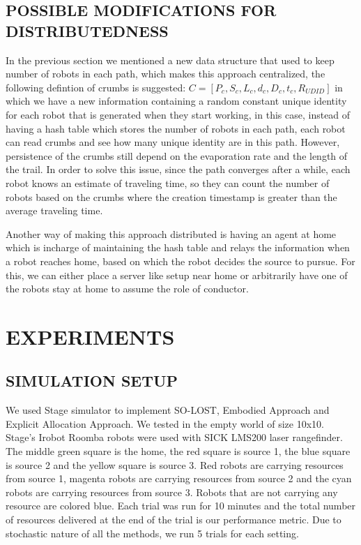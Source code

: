\documentclass[letterpaper, 10 pt, conference]{ieeeconf}  %
\begin{document}
\subsection{POSSIBLE MODIFICATIONS FOR DISTRIBUTEDNESS}
In the previous section we mentioned a new data structure that used to keep number of robots in each path, which makes this approach centralized, the following defintion of crumbs is suggested: $C = [P_c, S_c, L_c, d_c, D_c, t_c, R_{UDID}]$ in which we have a new information containing a random constant unique identity for each robot that is generated when they start working, in this case, instead of having a hash table which stores the number of robots in each path, each robot can read crumbs and see how many unique identity are in this path. However, persistence of the crumbs still depend on the evaporation rate and the length of the trail. In order to solve this issue, since the path converges after a while, each robot knows an estimate of traveling time, so they can count the number of robots based on the crumbs where the creation timestamp is greater than the average traveling time.

Another way of making this approach distributed is having an agent at home which is incharge of maintaining the hash table and relays the information when a robot reaches home, based on which the robot decides the source to pursue. For this, we can either place a server like setup near home or arbitrarily have one of the robots stay at home to assume the role of conductor.

\section{EXPERIMENTS} \label{section:experiments}

\subsection{SIMULATION SETUP}

We used Stage simulator \cite{STAGE} to implement SO-LOST, Embodied Approach and Explicit Allocation Approach. We tested in the empty world of size 10x10. Stage's Irobot Roomba robots were used with SICK LMS200 laser rangefinder. The middle green square is the home, the red square is source 1, the blue square is source 2 and the yellow square is source 3. Red robots are carrying resources from source 1, magenta robots are carrying resources from source 2 and the cyan robots are carrying resources from source 3. Robots that are not carrying any resource are colored blue. Each trial was run for 10 minutes and the total number of resources delivered at the end of the trial is our performance metric. Due to stochastic nature of all the methods, we run 5 trials for each setting.
\end{document}
